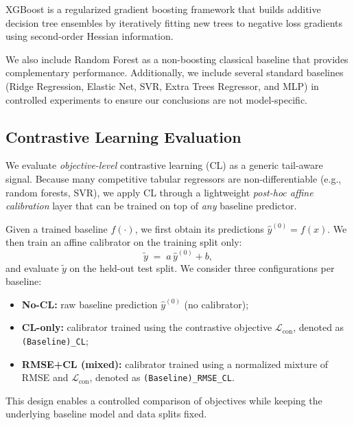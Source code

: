 \documentclass[pdflatex,sn-basic,Numbered]{sn-jnl}
\begin{document}
XGBoost is a regularized gradient boosting framework that builds additive decision tree ensembles by iteratively fitting new trees to negative loss gradients using second-order Hessian information.

We also include Random Forest as a non-boosting classical baseline that provides complementary performance. Additionally, we include several standard baselines (Ridge Regression, Elastic Net, SVR, Extra Trees Regressor, and MLP) in controlled experiments to ensure our conclusions are not model-specific.

\subsection{Contrastive Learning Evaluation}
\label{sec:contrastive}
We evaluate \emph{objective-level} contrastive learning (CL) as a generic tail-aware signal. Because many competitive tabular regressors are non-differentiable (e.g., random forests, SVR), we apply CL through a lightweight \emph{post-hoc affine calibration} layer that can be trained on top of \emph{any} baseline predictor.

Given a trained baseline $f(\cdot)$, we first obtain its predictions $\hat{y}^{(0)}=f(x)$. We then train an affine calibrator on the training split only:
\begin{equation}
\tilde{y} \;=\; a\,\hat{y}^{(0)} + b,
\end{equation}
and evaluate $\tilde{y}$ on the held-out test split. We consider three configurations per baseline:
\begin{itemize}
    \item \textbf{No-CL:} raw baseline prediction $\hat{y}^{(0)}$ (no calibrator);
    \item \textbf{CL-only:} calibrator trained using the contrastive objective $\mathcal{L}_{\mathrm{con}}$, denoted as \texttt{(Baseline)\_CL};
    \item \textbf{RMSE+CL (mixed):} calibrator trained using a normalized mixture of RMSE and $\mathcal{L}_{\mathrm{con}}$, denoted as \texttt{(Baseline)\_RMSE\_CL}.
\end{itemize}
This design enables a controlled comparison of objectives while keeping the underlying baseline model and data splits fixed.
\end{document}
